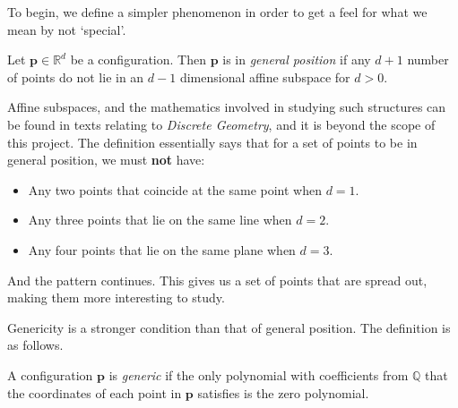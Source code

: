 \begin{flushleft}
To begin, we define a simpler phenomenon in order to get a feel for what we mean by not `special'.    
\end{flushleft}

\begin{definition}
\cite{discrete} Let $\mathbf{p} \in \mathbb{R}^d$ be a configuration. Then $\mathbf{p}$ is in \textit{general position} if any $d+1$ number of points do not lie in an $d-1$ dimensional affine subspace for $d>0$.
\end{definition}

\begin{flushleft}
Affine subspaces, and the mathematics involved in studying such structures can be found in texts relating to \textit{Discrete Geometry}, and it is beyond the scope of this project. The definition essentially says that for a set of points to be in general position, we must \textbf{not} have:
\begin{itemize}
    \item Any two points that coincide at the same point when $d = 1$.
    \vspace{-3mm}
    \item Any three points that lie on the same line when $d = 2$.
    \vspace{-3mm}
    \item Any four points that lie on the same plane when $d = 3$.
\end{itemize}

And the pattern continues. This gives us a set of points that are spread out, making them more interesting to study.
\end{flushleft}

\begin{flushleft} 
Genericity is a stronger condition than that of general position. The definition is as follows.
\end{flushleft}

\begin{definition}
A configuration $\mathbf{p}$ is \textit{generic} if the only polynomial with coefficients from $\mathbb{Q}$ that the coordinates of each point in $\mathbf{p}$ satisfies is the zero polynomial.
\end{definition}

